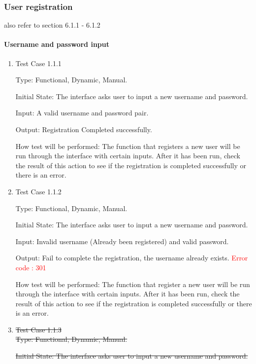 \documentclass[12pt, titlepage]{article}
\begin{document}
\subsubsection{User registration}
also refer to section 6.1.1 - 6.1.2
		
\paragraph{Username and password input}

\begin{enumerate}

\item{Test Case 1.1.1\\}

Type: Functional, Dynamic, Manual.
					
Initial State: The interface asks user to input a new username and password.
					
Input: A valid username and password pair.
					
Output: Registration Completed successfully.
					
How test will be performed: The function that registers a new user will be run through the interface with certain inputs. After it has been run, check the result of this action to see if the registration is completed successfully or there is an error.
					
\item{Test Case 1.1.2\\}

Type: Functional, Dynamic, Manual.
					
Initial State: The interface asks user to input a new username and password.
					
Input: Invalid username (Already been registered) and valid password.
					
Output: Fail to complete the registration, the username already exists. \textcolor{red}{Error code : 301}
					
How test will be performed: The function that register a new user will be run through the interface with certain inputs. After it has been run, check the result of this action to see if the registration is completed successfully or there is an error.

\item \st{ Test Case 1.1.3} \\

\st{Type: Functional, Dynamic, Manual.}
					
\st{ Initial State: The interface asks user to input a new username and password.}
					

\end{enumerate}
\end{document}
